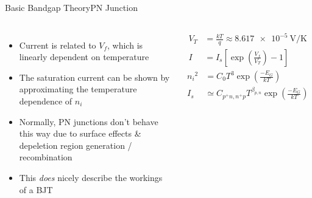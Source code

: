 \documentclass[aspectratio=1610]{beamer} %
\begin{document}
\begin{frame}{Basic Bandgap Theory}{PN Junction}

\begin{columns}[c]
    \begin{itemize}
        \item Current is related to \(V_f\), which is linearly dependent on temperature
        \item The saturation current can be shown by approximating the temperature dependence of \(n_i\)~\cite{Brugler1967}
        \item Normally, PN junctions don't behave this way due to surface effects \& depeletion region generation / recombination~\cite{Sah1957}
        \item This \emph{does} nicely describe the workings of a BJT
    \end{itemize}

    \small
	\begin{align}
        V_T &= \frac{kT}{q} \approx \qty{8.617e-5}{\V\per\K} \label{eq:vt} \\
        I &= I_s\left[\exp{\left(\frac{V_f}{V_T}\right)} - 1\right] \label{eq:pn_i}
    \end{align}
    \begin{align}
        {n_i}^2 &= C_0 T^3 \exp{\left(\frac{-E_G}{kT}\right)} \nonumber \\
        I_s &\simeq C_{p^+n,n^+p} T^{\beta_{p,n}} \exp{\left(\frac{-E_G}{kT}\right)} \label{eq:pn_is}
    \end{align}
\end{columns}
\end{frame}
\end{document}
